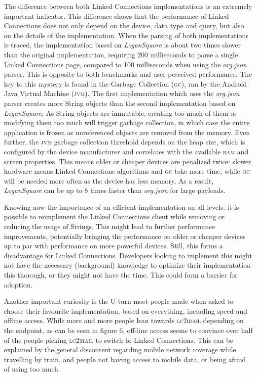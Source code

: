 \documentclass[twocolumn]{phdsymp} %
\begin{document}
The difference between both Linked Connections implementations is an extremely important indicator. This difference shows that the performance of Linked Connections
does not only depend on the device, data type and query, but also on the details of the implementation. When the parsing of both implementations is traced, the implementation based on \emph{LoganSquare} is about two times slower than the original implementation, requiring 200 milliseconds to parse a single Linked Connections page, compared to 100 milliseconds when using the \emph{org.json} parser. This is opposite to both benchmarks and user-perceived performance. The key to this mystery is found in the Garbage Collection (\textsc{gc}), ran by the Android Java Virtual Machine (\textsc{jvm}). The first implementation which uses the \emph{org.json} parser creates more String objects than the second implementation based on \emph{LoganSquare}. As String objects are immutable, creating too much of them or modifying them too much will trigger garbage collection, in which case the entire application is frozen as unreferenced objects are removed from the memory. Even further, the \textsc{jvm} garbage collection threshold depends on the heap size, which is configured by the device manufacturer and correlates with the available \textsc{ram} and screen properties. This
means older or cheaper devices are penalized twice: slower hardware means Linked Connections algorithms and \textsc{gc} take more time, while \textsc{gc} will be needed more often as the device has less memory. As a result, \emph{LoganSquare} can be up to 8 times faster than \emph{org.json} for large payloads.

Knowing now the importance of an efficient implementation on all levels, it is possible to reimplement the Linked Connections client while removing or reducing the usage of
Strings. This might lead to further performance improvements, potentially bringing the performance on older or cheaper devices up to par with performance on more powerful devices. Still, this forms a disadvantage for Linked Connections. Developers looking to implement this might not have the necessary (background) knowledge to optimize
their implementation this thorough, or they might not have the time. This could form a barrier for adoption.

Another important curiosity is the U-turn most people made when asked to choose their favourite implementation, based on everything, including speed and offline access.
While more and more people lean towards \textsc{lc2irail} depending on the endpoint, as can be seen in figure 6, off-line access seems to convince over half of the people picking \textsc{lc2irail} to switch to Linked Connections. This can be explained by the general discontent regarding mobile network coverage while travelling by train, and people not having access to mobile data, or being afraid of using too much.
\end{document}
